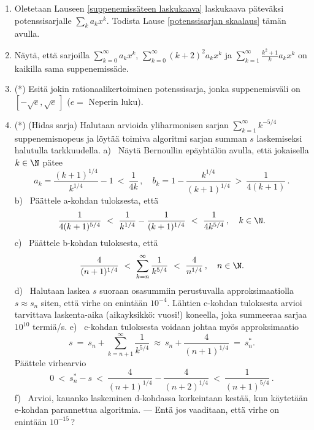 \begin{enumerate}
\item
Oletetaan Lauseen \ref{suppenemissäteen laskukaava} laskukaava päteväksi potenssisarjalle 
$\sum_k a_k x^k$. Todista Lause \ref{potenssisarjan skaalaus} tämän avulla.

\item
Näytä, että sarjoilla $\sum_{k=0}^\infty a_k x^k$, $\sum_{k=0}^\infty (k+2)^2 a_k x^k$ ja 
$\sum_{k=1}^\infty \frac{k^2+1}{k} a_k x^k$ on kaikilla sama suppenemissäde. 

\item (*)
Esitä jokin rationaalikertoiminen potenssisarja, jonka suppenemisväli on 
$[-\sqrt{e},\sqrt{e}\,]$ ($e=$ Neperin luku).

\item (*) (Hidas sarja) \label{H-I-12: hidas sarja}
Halutaan arvioida yliharmonisen sarjan $\sum_{k=1}^\infty k^{-5/4}$ suppenemisnopeus ja löytää
toimiva algoritmi sarjan summan $s$ laskemiseksi halutulla tarkkuudella. \newline
a) \ Näytä Bernoullin epäyhtälön avulla, että jokaisella $k\in\N$ pätee
\[
a_k = \frac{(k+1)^{1/4}}{k^{1/4}}-1\ <\ \frac{1}{4k}\,, \quad 
b_k = 1-\frac{k^{1/4}}{(k+1)^{1/4}}\ >\ \frac{1}{4(k+1)}\,.
\]
b) \ Päättele a-kohdan tuloksesta, että
\[
\frac{1}{4(k+1)^{5/4}}\ <\ \frac{1}{k^{1/4}}-\frac{1}{(k+1)^{1/4}}\ 
                        <\ \frac{1}{4k^{5/4}}\,, \quad k\in\N.
\]
c) \ Päättele b-kohdan tuloksesta, että
\[
\frac{4}{(n+1)^{1/4}}\ <\ \sum_{k=n}^\infty \frac{1}{k^{5/4}}\ 
                       <\ \frac{4}{n^{1/4}}\,, \quad n\in\N.
\]
d) \ Halutaan laskea $s$ suoraan osasummiin perustuvalla approksimaatiolla $s \approx s_n$ 
siten, että virhe on enintään $10^{-4}$. Lähtien c-kohdan tuloksesta arvioi tarvittava 
laskenta-aika (aikayksikkö: vuosi!) koneella, joka summeeraa sarjaa $10^{10}$ termiä/s. \newline
e) \ c-kohdan tuloksesta voidaan johtaa myös approksimaatio 
\[
s\ =\ s_n + \sum_{k=n+1}^\infty \frac{1}{k^{5/4}}\ \approx\ s_n+\frac{4}{(n+1)^{1/4}}\ =\ s_n^*.
\]
Päättele virhearvio
\[
0\ <\ s_n^*-s\ <\ \frac{4}{(n+1)^{1/4}}-\frac{4}{(n+2)^{1/4}}\ <\ \frac{1}{(n+1)^{5/4}}\,.
\]
f) \ Arvioi, kauanko laskeminen d-kohdassa korkeintaan kestää, kun käytetään e-kohdan 
parannettua algoritmia. --- Entä jos vaaditaan, että virhe on enintään $10^{-15}$\,?

\end{enumerate}